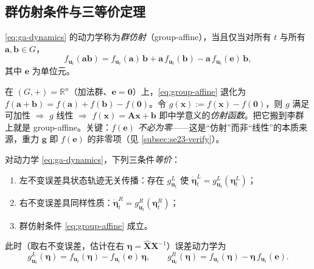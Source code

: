 \subsection{群仿射条件与三等价定理}
\label{subsec:ga-theorem}

\begin{definition}[群仿射动力学]\label{def:group-affine}
\cref{eq:ga-dynamics} 的动力学称为\emph{群仿射}（group-affine），当且仅当对所有 $t$ 与所有 $\mathbf{a},\mathbf{b}\in G$，
\begin{equation}
  \boxed{\;f_{\mathbf{u}_t}(\mathbf{a}\mathbf{b})=f_{\mathbf{u}_t}(\mathbf{a})\,\mathbf{b}+\mathbf{a}\,f_{\mathbf{u}_t}(\mathbf{b})-\mathbf{a}\,f_{\mathbf{u}_t}(\mathbf{e})\,\mathbf{b},\;}
  \label{eq:group-affine}
\end{equation}
其中 $\mathbf{e}$ 为单位元。
\end{definition}

\begin{insight}[为什么叫“仿射”]
在 $(G,+)=\mathbb{R}^n$（加法群、$\mathbf{e}=\mathbf{0}$）上，\cref{eq:group-affine} 退化为 $f(\mathbf{a}+\mathbf{b})=f(\mathbf{a})+f(\mathbf{b})-f(\mathbf{0})$。令 $g(\mathbf{x}):=f(\mathbf{x})-f(\mathbf{0})$，则 $g$ 满足可加性 $\Rightarrow$ $g$ 线性 $\Rightarrow$ $f(\mathbf{x})=\mathbf{A}\mathbf{x}+\mathbf{b}$ 即中学意义的\emph{仿射函数}。把它搬到李群上就是 group-affine。关键：$f(\mathbf{e})$ \emph{不必为零}——这是“仿射”而非“线性”的本质来源，重力 $\mathbf{g}$ 即 $f(\mathbf{e})$ 的非零项（见 \cref{subsec:se23-verify}）。
\end{insight}

\begin{theorem}\label{thm:ga-equiv}
对动力学 \cref{eq:ga-dynamics}，下列三条件\emph{等价}：
\begin{enumerate}
  \item[(i)] 左不变误差具状态轨迹无关传播：存在 $g^L_{\mathbf{u}_t}$ 使 $\dot{\boldsymbol{\eta}}^L_t=g^L_{\mathbf{u}_t}(\boldsymbol{\eta}^L_t)$；
  \item[(ii)] 右不变误差具同样性质：$\dot{\boldsymbol{\eta}}^R_t=g^R_{\mathbf{u}_t}(\boldsymbol{\eta}^R_t)$；
  \item[(iii)] 群仿射条件 \cref{eq:group-affine} 成立。
\end{enumerate}
此时（取右不变误差，估计在右 $\boldsymbol{\eta}=\hat{\mathbf{X}}\mathbf{X}^{-1}$）误差动力学为
\begin{equation}
  g^L_{\mathbf{u}_t}(\boldsymbol{\eta})=f_{\mathbf{u}_t}(\boldsymbol{\eta})-f_{\mathbf{u}_t}(\mathbf{e})\,\boldsymbol{\eta},\qquad
  g^R_{\mathbf{u}_t}(\boldsymbol{\eta})=f_{\mathbf{u}_t}(\boldsymbol{\eta})-\boldsymbol{\eta}\,f_{\mathbf{u}_t}(\mathbf{e}).
  \label{eq:ga-error-dyn}
\end{equation}
\end{theorem}

